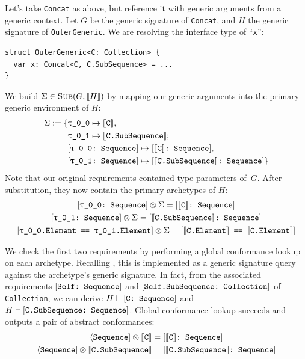 \documentclass[../generics]{subfiles}
\begin{document}
\begin{example} Let's take \texttt{Concat} as above, but reference it with generic arguments from a generic context. Let $G$ be the generic signature of \texttt{Concat}, and $H$ the generic signature of \texttt{OuterGeneric}. We are resolving the interface type of ``\texttt{x}'':
\begin{Verbatim}
struct OuterGeneric<C: Collection> {
  var x: Concat<C, C.SubSequence> = ...
}
\end{Verbatim}
We build $\Sigma\in\textsc{Sub}({G, [\![H]\!]})$ by mapping our generic arguments into the primary generic environment of $H$:
\begin{align*}
\Sigma := \SubstMapC{
&\SubstType{\rT}{$\archetype{C}$},\\
&\SubstType{\rU}{$\archetype{C.SubSequence}$}
}{
\\
&\SubstConf{\rT}{$\archetype{C}$}{Sequence},\\
&\SubstConf{\rU}{$\archetype{C.SubSequence}$}{Sequence}
}
\end{align*}
Note that our original requirements contained type parameters of~$G$. After substitution, they now contain the primary archetypes of $H$:
\begin{gather*}
\rTSequence\otimes\Sigma = \ConfReq{$\archetype{C}$}{Sequence}\\
\rUSequence\otimes\Sigma = \ConfReq{$\archetype{C.SubSequence}$}{Sequence}\\
\SameReq{\rT.Element}{\rU.Element}\otimes\Sigma = \SameReq{$\archetype{C.Element}$}{$\archetype{C.Element}$}
\end{gather*}

We check the first two requirements by performing a global conformance lookup on each archetype. Recalling , this is implemented as a generic signature query against the archetype's generic signature. In fact, from the associated requirements $[\texttt{Self:~Sequence}]$ and $[\texttt{Self.SubSequence:~Collection}]$ of \texttt{Collection}, we can derive $H\vdash[\texttt{C:~Sequence}]$ and $H\vdash[\texttt{C.SubSequence:~Sequence}]$. Global conformance lookup succeeds and outputs a pair of abstract conformances:
\begin{gather*}
\Proto{Sequence}\otimes\archetype{C}=\ConfReq{$\archetype{C}$}{Sequence}\\
\Proto{Sequence}\otimes\archetype{C.SubSequence}=\ConfReq{$\archetype{C.SubSequence}$}{Sequence}
\end{gather*}


\end{example}
\end{document}
